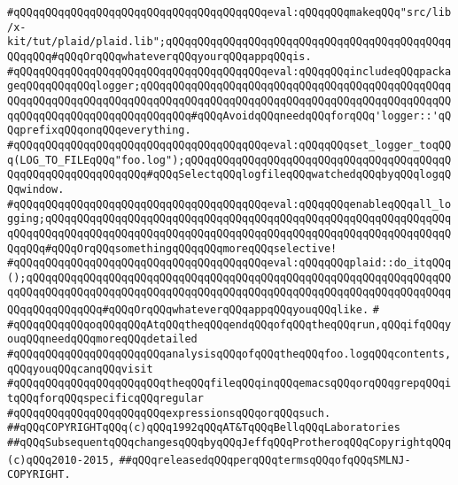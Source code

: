 \verb|#qQQqqQQqqQQqqQQqqQQqqQQqqQQqqQQqqQQqqQQqeval:qQQqqQQqmakeqQQq"src/lib/x-kit/tut/plaid/plaid.lib";qQQqqQQqqQQqqQQqqQQqqQQqqQQqqQQqqQQqqQQqqQQqqQQqqQQq#qQQqOrqQQqwhateverqQQqyourqQQqappqQQqis.|\newline
\verb|#qQQqqQQqqQQqqQQqqQQqqQQqqQQqqQQqqQQqqQQqeval:qQQqqQQqincludeqQQqpackageqQQqqQQqqQQqlogger;qQQqqQQqqQQqqQQqqQQqqQQqqQQqqQQqqQQqqQQqqQQqqQQqqQQqqQQqqQQqqQQqqQQqqQQqqQQqqQQqqQQqqQQqqQQqqQQqqQQqqQQqqQQqqQQqqQQqqQQqqQQqqQQqqQQqqQQqqQQqqQQqqQQq#qQQqAvoidqQQqneedqQQqforqQQq'logger::'qQQqprefixqQQqonqQQqeverything.|\newline
\verb|#qQQqqQQqqQQqqQQqqQQqqQQqqQQqqQQqqQQqqQQqeval:qQQqqQQqset_logger_toqQQq(LOG_TO_FILEqQQq"foo.log");qQQqqQQqqQQqqQQqqQQqqQQqqQQqqQQqqQQqqQQqqQQqqQQqqQQqqQQqqQQqqQQq#qQQqSelectqQQqlogfileqQQqwatchedqQQqbyqQQqlogqQQqwindow.|\newline
\verb|#qQQqqQQqqQQqqQQqqQQqqQQqqQQqqQQqqQQqqQQqeval:qQQqqQQqenableqQQqall_logging;qQQqqQQqqQQqqQQqqQQqqQQqqQQqqQQqqQQqqQQqqQQqqQQqqQQqqQQqqQQqqQQqqQQqqQQqqQQqqQQqqQQqqQQqqQQqqQQqqQQqqQQqqQQqqQQqqQQqqQQqqQQqqQQqqQQqqQQqqQQq#qQQqOrqQQqsomethingqQQqqQQqmoreqQQqselective!|\newline
\verb|#qQQqqQQqqQQqqQQqqQQqqQQqqQQqqQQqqQQqqQQqeval:qQQqqQQqplaid::do_itqQQq();qQQqqQQqqQQqqQQqqQQqqQQqqQQqqQQqqQQqqQQqqQQqqQQqqQQqqQQqqQQqqQQqqQQqqQQqqQQqqQQqqQQqqQQqqQQqqQQqqQQqqQQqqQQqqQQqqQQqqQQqqQQqqQQqqQQqqQQqqQQqqQQqqQQqqQQq#qQQqOrqQQqwhateverqQQqappqQQqyouqQQqlike.|\newline
\verb|#|\newline
\verb|#qQQqqQQqqQQqoqQQqqQQqAtqQQqtheqQQqendqQQqofqQQqtheqQQqrun,qQQqifqQQqyouqQQqneedqQQqmoreqQQqdetailed|\newline
\verb|#qQQqqQQqqQQqqQQqqQQqqQQqanalysisqQQqofqQQqtheqQQqfoo.logqQQqcontents,qQQqyouqQQqcanqQQqvisit|\newline
\verb|#qQQqqQQqqQQqqQQqqQQqqQQqtheqQQqfileqQQqinqQQqemacsqQQqorqQQqgrepqQQqitqQQqforqQQqspecificqQQqregular|\newline
\verb|#qQQqqQQqqQQqqQQqqQQqqQQqexpressionsqQQqorqQQqsuch.|\newline
\newline
\newline
\newline
\verb|##qQQqCOPYRIGHTqQQq(c)qQQq1992qQQqAT&TqQQqBellqQQqLaboratories|\newline
\verb|##qQQqSubsequentqQQqchangesqQQqbyqQQqJeffqQQqProtheroqQQqCopyrightqQQq(c)qQQq2010-2015,|\newline
\verb|##qQQqreleasedqQQqperqQQqtermsqQQqofqQQqSMLNJ-COPYRIGHT.|\newline

